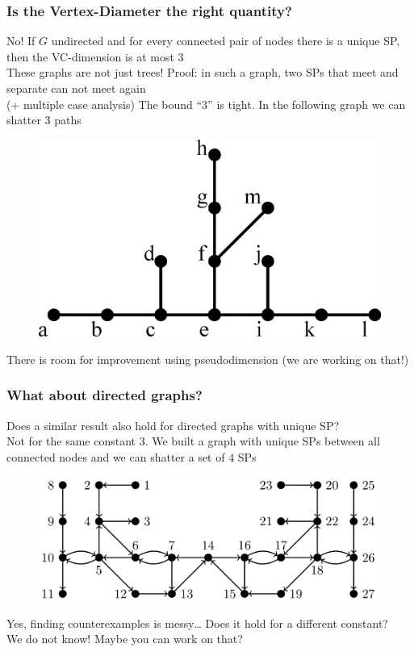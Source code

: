\documentclass[aspectratio=169]{beamer}
\begin{document}
\begin{frame}
  \frametitle{Is the Vertex-Diameter the right quantity?}
  No! If $G$ undirected and for every connected pair of nodes there is a
  unique SP, then the VC-dimension is at most 3\\
  \quad These graphs are not just trees!
  \vfill
  Proof: in such a graph, two SPs that meet and separate can not meet again\\
  \quad (+ multiple case analysis)
  \vfill
  The bound ``3'' is tight. In the following graph we can shatter 3 paths
  \begin{figure}[H]
    \centering
    \includegraphics[scale=0.3]{figs/uniqueshortestpathtight}
  \end{figure}
  \vfill
  There is room for improvement using pseudodimension (we are working on that!)
\end{frame}

\begin{frame}
  \frametitle{What about directed graphs?}
  Does a similar result also hold for directed graphs with unique SP?\\
  \quad  Not for the same constant $3$. We built a graph with unique SPs between
  all connected nodes and we can shatter a set of $4$ SPs
  \begin{figure}[H]
    \centering
    \includegraphics[scale=0.3]{figs/uniquedirected}
  \end{figure}
  Yes, finding counterexamples is messy\ldots
  \vfill
  Does it hold for a different constant?\\
  \quad We do not know! Maybe you can work on that?
\end{frame}
\end{document}
